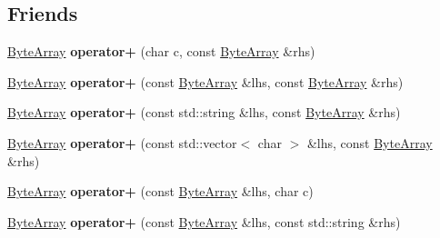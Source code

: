 \subsection*{Friends}
\begin{DoxyCompactItemize}
\item 
\mbox{\label{class_cpp_serial_port_1_1_byte_array_a76332659506cc3c3ecaec0d305c59de9}} 
\mbox{\hyperlink{class_cpp_serial_port_1_1_byte_array}{Byte\+Array}} {\bfseries operator+} (char c, const \mbox{\hyperlink{class_cpp_serial_port_1_1_byte_array}{Byte\+Array}} \&rhs)
\item 
\mbox{\label{class_cpp_serial_port_1_1_byte_array_a35b059cbb7652131e2e9a8151ad67db3}} 
\mbox{\hyperlink{class_cpp_serial_port_1_1_byte_array}{Byte\+Array}} {\bfseries operator+} (const \mbox{\hyperlink{class_cpp_serial_port_1_1_byte_array}{Byte\+Array}} \&lhs, const \mbox{\hyperlink{class_cpp_serial_port_1_1_byte_array}{Byte\+Array}} \&rhs)
\item 
\mbox{\label{class_cpp_serial_port_1_1_byte_array_a72b61cc5ade4da63abce18c96b18c9f1}} 
\mbox{\hyperlink{class_cpp_serial_port_1_1_byte_array}{Byte\+Array}} {\bfseries operator+} (const std\+::string \&lhs, const \mbox{\hyperlink{class_cpp_serial_port_1_1_byte_array}{Byte\+Array}} \&rhs)
\item 
\mbox{\label{class_cpp_serial_port_1_1_byte_array_af5fb63acc032e53e7c336ba7fb64229e}} 
\mbox{\hyperlink{class_cpp_serial_port_1_1_byte_array}{Byte\+Array}} {\bfseries operator+} (const std\+::vector$<$ char $>$ \&lhs, const \mbox{\hyperlink{class_cpp_serial_port_1_1_byte_array}{Byte\+Array}} \&rhs)
\item 
\mbox{\label{class_cpp_serial_port_1_1_byte_array_a3766c56e8a8886283657da1df994a7a4}} 
\mbox{\hyperlink{class_cpp_serial_port_1_1_byte_array}{Byte\+Array}} {\bfseries operator+} (const \mbox{\hyperlink{class_cpp_serial_port_1_1_byte_array}{Byte\+Array}} \&lhs, char c)
\item 
\mbox{\label{class_cpp_serial_port_1_1_byte_array_a9f8c740a46266a3deb922e3fc0dcee37}} 
\mbox{\hyperlink{class_cpp_serial_port_1_1_byte_array}{Byte\+Array}} {\bfseries operator+} (const \mbox{\hyperlink{class_cpp_serial_port_1_1_byte_array}{Byte\+Array}} \&lhs, const std\+::string \&rhs)

\end{DoxyCompactItemize}
